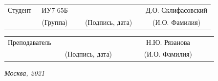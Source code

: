 \documentclass[14pt, a4paper]{extarticle}
\begin{document}
\noindent
{}
\\


\noindent
{}
\\

\vspace{1.5cm}
\noindent
\begin{tabular}{l c c c c c}
	Студент      & ~ИУ7-65Б~               & \hspace{2.5cm} & \hspace{2cm}                 & &  Д.О. Склифасовский \\\cline{2-2}\cline{4-4} \cline{6-6} 
	\hspace{3cm} & {\footnotesize(Группа)} &                & {\footnotesize(Подпись, дата)} & & {\footnotesize(И.О. Фамилия)}
\end{tabular}

\noindent
\begin{tabular}{l c c c c}
	Преподаватель & \hspace{5cm}   & \hspace{2cm}                 & & ~~~~~~Н.Ю. Рязанова~~~~~~\\\cline{3-3} \cline{5-5} 
	\hspace{3cm}  &                & {\footnotesize(Подпись, дата)} & & {\footnotesize(И.О. Фамилия)}
\end{tabular}

\vspace{0.6cm}
\begin{center}	
	\vfill
	\large \textit {Москва, 2021}
\end{center}

\thispagestyle {empty}
\pagebreak

\clearpage
\end{document}
